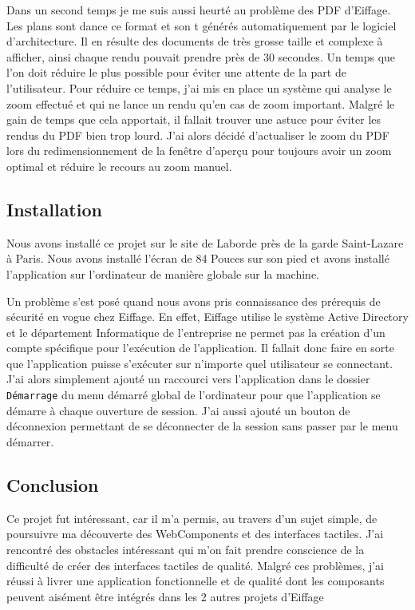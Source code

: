 Dans un second temps je me suis aussi heurté au problème des PDF d'Eiffage.
Les plans sont dance ce format et son t générés automatiquement par le logiciel d'architecture.
Il en résulte des documents de très grosse taille et complexe à afficher, ainsi chaque rendu pouvait prendre près de 30 secondes.
Un temps que l'on doit réduire le plus possible pour éviter une attente de la part de l'utilisateur.
Pour réduire ce temps, j'ai mis en place un système qui analyse le zoom effectué et qui ne lance un rendu qu'en cas de zoom important.
Malgré le gain de temps que cela apportait, il fallait trouver une astuce pour éviter les rendus du PDF bien trop lourd.
J'ai alors décidé d'actualiser le zoom du PDF lors du redimensionnement de la fenêtre d'aperçu pour toujours avoir un zoom optimal et réduire le recours au zoom manuel.

\subsection{Installation}

Nous avons installé ce projet sur le site de Laborde près de la garde Saint-Lazare à Paris.
Nous avons installé l'écran de 84 Pouces sur son pied et avons installé l'application sur l'ordinateur de manière globale sur la machine.

Un problème s'est posé quand nous avons pris connaissance des prérequis de sécurité en vogue chez Eiffage.
En effet, Eiffage utilise le système Active Directory et le département Informatique de l'entreprise ne permet pas la création d'un compte spécifique pour l'exécution de l'application.
Il fallait donc faire en sorte que l'application puisse s'exécuter sur n'importe quel utilisateur se connectant.
J'ai alors simplement ajouté un raccourci vers l'application dans le dossier \texttt{Démarrage} du menu démarré global de l'ordinateur pour que l'application se démarre à chaque ouverture de session.
J'ai aussi ajouté un bouton de déconnexion permettant de se déconnecter de la session sans passer par le menu démarrer.

\subsection{Conclusion}

Ce projet fut intéressant, car il m'a permis, au travers d'un sujet simple, de poursuivre ma découverte des WebComponents et des interfaces tactiles.
J'ai rencontré des obstacles intéressant qui m'on fait prendre conscience de la difficulté de créer des interfaces tactiles de qualité.
Malgré ces problèmes, j'ai réussi à livrer une application fonctionnelle et de qualité dont les composants peuvent aisément être intégrés dans les 2 autres projets d'Eiffage
